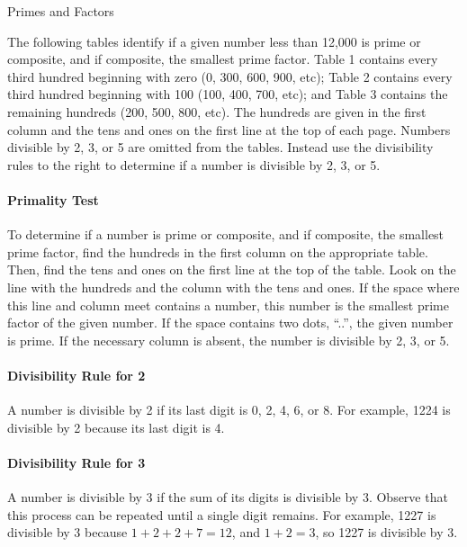\documentclass{article}
\begin{document}

\begin{center}
\begin{huge}
  Primes and Factors
\end{huge}
\end{center}

\begin{multicols}{2}

The following tables identify if a given number less than 12,000 is prime or composite,
  and if composite, the smallest prime factor. Table 1 contains every third hundred
  beginning with zero (0, 300, 600, 900, etc); Table 2 contains every third hundred
  beginning with 100 (100, 400, 700, etc); and Table 3 contains the remaining hundreds
  (200, 500, 800, etc). The hundreds are given in the first column and the tens and ones
  on the first line at the top of each page. Numbers divisible by 2, 3, or 5 are omitted
  from the tables. Instead use the divisibility rules to the right to determine if a
  number is divisible by 2, 3, or 5.

\paragraph{Primality Test} To determine if a number is prime or composite, and if
  composite, the smallest prime factor, find the hundreds in the first column on the
  appropriate table. Then, find the tens and ones on the first line at the top of the
  table. Look on the line with the hundreds and the column with the tens and ones. If
  the space where this line and column meet contains a number, this number is the
  smallest prime factor of the given number. If the space contains two dots, ``..'', the
  given number is prime. If the necessary column is absent, the number is divisible by
  2, 3, or 5.

\paragraph{Divisibility Rule for 2} A number is divisible by 2 if its last digit is 0,
  2, 4, 6, or 8. For example, 1224 is divisible by 2 because its last digit is 4.

\paragraph{Divisibility Rule for 3} A number is divisible by 3 if the sum of its digits
  is divisible by 3. Observe that this process can be repeated until a single digit
  remains. For example, 1227 is divisible by 3 because $1+2+2+7=12$, and $1+2=3$, so 1227
  is divisible by 3.


\end{multicols}
\end{document}

